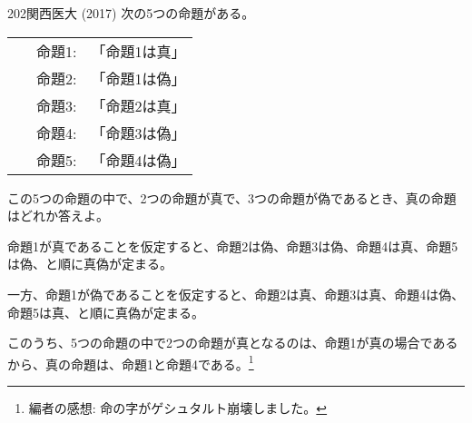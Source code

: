 \begin{thm}{202}{}{関西医大 (2017)}
 次の5つの命題がある。

 \begin{tabular}{cc}
  ~~~命題1: & 「命題1は真」\\
  ~~~命題2: & 「命題1は偽」\\
  ~~~命題3: & 「命題2は真」\\
  ~~~命題4: & 「命題3は偽」\\
  ~~~命題5: & 「命題4は偽」\\
 \end{tabular}

 この5つの命題の中で、2つの命題が真で、3つの命題が偽であるとき、真の命題はどれか答えよ。
\end{thm}

命題1が真であることを仮定すると、命題2は偽、命題3は偽、命題4は真、命題5は偽、と順に真偽が定まる。

一方、命題1が偽であることを仮定すると、命題2は真、命題3は真、命題4は偽、命題5は真、と順に真偽が定まる。

このうち、5つの命題の中で2つの命題が真となるのは、命題1が真の場合であるから、真の命題は、命題1と命題4である。\footnote{編者の感想: 命の字がゲシュタルト崩壊しました。}